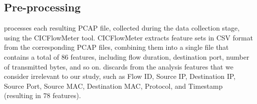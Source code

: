  
   
  



\subsection{Pre-processing}


\droidxpflow processes each resulting PCAP file, collected during the data collection stage, using the CICFlowMeter tool.
CICFlowMeter extracts feature sets in CSV format from the corresponding PCAP files, combining them into a single file that
contains a total of 86 features, including flow duration, destination port, number of transmitted bytes, and so on.
\droidxpflow discards from the analysis features that we consider irrelevant to our study, such as
Flow ID, Source IP, Destination IP, Source Port, Source MAC, Destination MAC, Protocol, and Timestamp
(resulting in 78 features).


